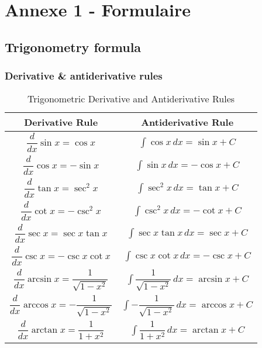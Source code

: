 \chapter{Annexe 1 - Formulaire}

\section{Trigonometry formula}

\subsection{Derivative \& antiderivative rules}

\begin{table}[h]
\centering
\begin{tabular}{|c|c|}
\hline
\textbf{Derivative Rule} & \textbf{Antiderivative Rule} \\
\hline
$\dfrac{d}{dx}\sin x = \cos x$ & $\int \cos x \, dx = \sin x + C$ \\
\hline
$\dfrac{d}{dx}\cos x = -\sin x$ & $\int \sin x \, dx = -\cos x + C$ \\
\hline
$\dfrac{d}{dx}\tan x = \sec^2 x$ & $\int \sec^2 x \, dx = \tan x + C$ \\
\hline
$\dfrac{d}{dx}\cot x = -\csc^2 x$ & $\int \csc^2 x \, dx = -\cot x + C$ \\
\hline
$\dfrac{d}{dx}\sec x = \sec x\tan x$ & $\int \sec x\tan x \, dx = \sec x + C$ \\
\hline
$\dfrac{d}{dx}\csc x = -\csc x\cot x$ & $\int \csc x\cot x \, dx = -\csc x + C$ \\
\hline
$\dfrac{d}{dx}\arcsin x = \dfrac{1}{\sqrt{1-x^2}}$ & $\int \dfrac{1}{\sqrt{1-x^2}} \, dx = \arcsin x + C$ \\
\hline
$\dfrac{d}{dx}\arccos x = -\dfrac{1}{\sqrt{1-x^2}}$ & $\int -\dfrac{1}{\sqrt{1-x^2}} \, dx = \arccos x + C$ \\
\hline
$\dfrac{d}{dx}\arctan x = \dfrac{1}{1+x^2}$ & $\int \dfrac{1}{1+x^2} \, dx = \arctan x + C$ \\

\hline
\end{tabular}
\caption{Trigonometric Derivative and Antiderivative Rules}
\label{tab:trig-rules}
\end{table}


